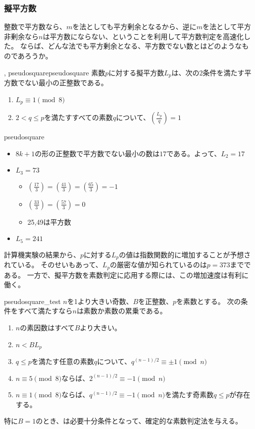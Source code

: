 \subsubsection{擬平方数}
整数で平方数なら、$m$を法としても平方剰余となるから、逆に$m$を法として平方非剰余なら$n$は平方数にならない、ということを利用して平方数判定を高速化した。
ならば、どんな法でも平方剰余となる、平方数でない数とはどのようなものであろうか。

\begin{Defi}{, pseudosquare}{pseudosquare}
素数$p$に対する擬平方数$L_p$は、次の2条件を満たす平方数でない最小の正整数である。
\begin{enumerate}
 \item $L_p \equiv 1 \pmod{8}$
 \item $2<q\le p$を満たすすべての素数$q$について、$\left(\frac{L_p}{q}\right)=1$
\end{enumerate}
\end{Defi}

\begin{Exam}{}{pseudosquare}\;
\begin{itemize}
 \item $8k+1$の形の正整数で平方数でない最小の数は$17$である。よって、$L_2 = 17$
 \item $L_3 = 73$
  \begin{itemize}
   \item $\left(\frac{17}{3}\right)=\left(\frac{41}{3}\right)=\left(\frac{65}{3}\right)=-1$
   \item $\left(\frac{33}{3}\right)=\left(\frac{57}{3}\right)=0$
   \item 25,49は平方数
  \end{itemize}
 \item $L_5 = 241$
\end{itemize}
\end{Exam}

計算機実験の結果から、$p$に対する$L_p$の値は指数関数的に増加することが予想されている。
そのせいもあって、$L_p$の厳密な値が知られているのは$p=373$までである\cite{10.1007/978-3-642-14518-6_26}。
一方で、擬平方数を素数判定に応用する際には、この増加速度は有利に働く。

\begin{Theo}{\cite{Lukes1996}}{pseudosquare_test}
$n$を1より大きい奇数、$B$を正整数、$p$を素数とする。
次の条件をすべて満たすなら$n$は素数か素数の累乗である。
\begin{enumerate}
 \item $n$の素因数はすべて$B$より大きい。
 \item $n < BL_p$
 \item $q \le p$を満たす任意の素数$q$について、$q^{(n-1)/2}\equiv \pm1\pmod{n}$
 \item $n\equiv 5\pmod{8}$ならば、$2^{(n-1)/2}\equiv-1\pmod{n}$
 \item $n\equiv 1\pmod{8}$ならば、$q^{(n-1)/2}\equiv -1\pmod{n}$を満たす奇素数$q \le p$が存在する。
\end{enumerate}
\end{Theo}

特に$B=1$のとき、は必要十分条件となって、確定的な素数判定法を与える。


